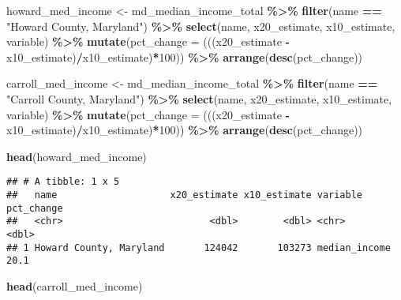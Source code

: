 \documentclass[
]{article}
\newenvironment{Shaded}{\begin{snugshade}}{\end{snugshade}}
\newcommand{\AttributeTok}[1]{\textcolor[rgb]{0.13,0.29,0.53}{#1}}
\newcommand{\DecValTok}[1]{\textcolor[rgb]{0.00,0.00,0.81}{#1}}
\newcommand{\FunctionTok}[1]{\textcolor[rgb]{0.13,0.29,0.53}{\textbf{#1}}}
\newcommand{\NormalTok}[1]{#1}
\newcommand{\OtherTok}[1]{\textcolor[rgb]{0.56,0.35,0.01}{#1}}
\newcommand{\SpecialCharTok}[1]{\textcolor[rgb]{0.81,0.36,0.00}{\textbf{#1}}}
\newcommand{\StringTok}[1]{\textcolor[rgb]{0.31,0.60,0.02}{#1}}
\begin{document}
\begin{Shaded}
\begin{Highlighting}[]
\NormalTok{howard\_med\_income }\OtherTok{\textless{}{-}}\NormalTok{ md\_median\_income\_total }\SpecialCharTok{\%\textgreater{}\%} 
  \FunctionTok{filter}\NormalTok{(name }\SpecialCharTok{==} \StringTok{"Howard County, Maryland"}\NormalTok{) }\SpecialCharTok{\%\textgreater{}\%} 
  \FunctionTok{select}\NormalTok{(name, x20\_estimate, x10\_estimate, variable) }\SpecialCharTok{\%\textgreater{}\%} 
  \FunctionTok{mutate}\NormalTok{(}\AttributeTok{pct\_change =}\NormalTok{ (((x20\_estimate }\SpecialCharTok{{-}}\NormalTok{ x10\_estimate)}\SpecialCharTok{/}\NormalTok{x10\_estimate)}\SpecialCharTok{*}\DecValTok{100}\NormalTok{)) }\SpecialCharTok{\%\textgreater{}\%}
  \FunctionTok{arrange}\NormalTok{(}\FunctionTok{desc}\NormalTok{(pct\_change))}

\NormalTok{carroll\_med\_income }\OtherTok{\textless{}{-}}\NormalTok{ md\_median\_income\_total }\SpecialCharTok{\%\textgreater{}\%} 
  \FunctionTok{filter}\NormalTok{(name }\SpecialCharTok{==} \StringTok{"Carroll County, Maryland"}\NormalTok{) }\SpecialCharTok{\%\textgreater{}\%} 
  \FunctionTok{select}\NormalTok{(name, x20\_estimate, x10\_estimate, variable) }\SpecialCharTok{\%\textgreater{}\%} 
  \FunctionTok{mutate}\NormalTok{(}\AttributeTok{pct\_change =}\NormalTok{ (((x20\_estimate }\SpecialCharTok{{-}}\NormalTok{ x10\_estimate)}\SpecialCharTok{/}\NormalTok{x10\_estimate)}\SpecialCharTok{*}\DecValTok{100}\NormalTok{)) }\SpecialCharTok{\%\textgreater{}\%}
  \FunctionTok{arrange}\NormalTok{(}\FunctionTok{desc}\NormalTok{(pct\_change))}

\FunctionTok{head}\NormalTok{(howard\_med\_income)}
\end{Highlighting}
\end{Shaded}

\begin{verbatim}
## # A tibble: 1 x 5
##   name                    x20_estimate x10_estimate variable      pct_change
##   <chr>                          <dbl>        <dbl> <chr>              <dbl>
## 1 Howard County, Maryland       124042       103273 median_income       20.1
\end{verbatim}

\begin{Shaded}
\begin{Highlighting}[]
\FunctionTok{head}\NormalTok{(carroll\_med\_income)}
\end{Highlighting}
\end{Shaded}
\end{document}
